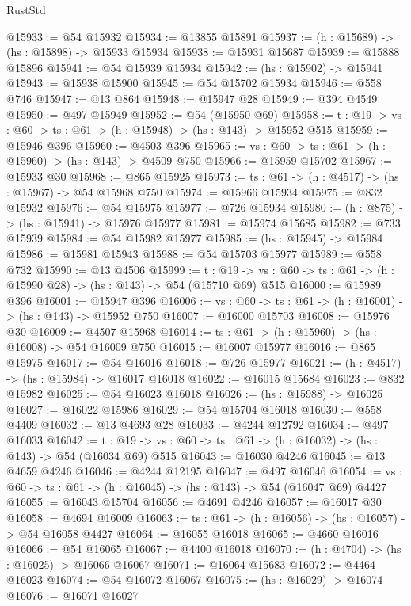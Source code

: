 \begin{lexlean}{RustStd}
\begin{coremodule}
@15933 := @54 @15932
@15934 := @13855 @15891
@15937 := (h : @15689) -> (hs : @15898) -> @15933 @15934
@15938 := @15931 @15687
@15939 := @15888 @15896
@15941 := @54 @15939 @15934
@15942 := (hs : @15902) -> @15941
@15943 := @15938 @15900
@15945 := @54 @15702 @15934
@15946 := @558 @746
@15947 := @13 @864
@15948 := @15947 @28
@15949 := @394 @4549
@15950 := @497 @15949
@15952 := @54 (@15950 @69)
@15958 := {t : @19} -> {vs : @60} -> {ts : @61} -> (h : @15948) -> (hs : @143) -> @15952 @515
@15959 := @15946 @396
@15960 := @4503 @396
@15965 := {vs : @60} -> {ts : @61} -> (h : @15960) -> (hs : @143) -> @4509 @750
@15966 := @15959 @15702
@15967 := @15933 @30
@15968 := @865 @15925
@15973 := {ts : @61} -> (h : @4517) -> (hs : @15967) -> @54 @15968 @750
@15974 := @15966 @15934
@15975 := @832 @15932
@15976 := @54 @15975
@15977 := @726 @15934
@15980 := (h : @875) -> (hs : @15941) -> @15976 @15977
@15981 := @15974 @15685
@15982 := @733 @15939
@15984 := @54 @15982 @15977
@15985 := (hs : @15945) -> @15984
@15986 := @15981 @15943
@15988 := @54 @15703 @15977
@15989 := @558 @732
@15990 := @13 @4506
@15999 := {t : @19} ->
  {vs : @60} -> {ts : @61} -> (h : @15990 @28) -> (hs : @143) -> @54 (@15710 @69) @515
@16000 := @15989 @396
@16001 := @15947 @396
@16006 := {vs : @60} -> {ts : @61} -> (h : @16001) -> (hs : @143) -> @15952 @750
@16007 := @16000 @15703
@16008 := @15976 @30
@16009 := @4507 @15968
@16014 := {ts : @61} -> (h : @15960) -> (hs : @16008) -> @54 @16009 @750
@16015 := @16007 @15977
@16016 := @865 @15975
@16017 := @54 @16016
@16018 := @726 @15977
@16021 := (h : @4517) -> (hs : @15984) -> @16017 @16018
@16022 := @16015 @15684
@16023 := @832 @15982
@16025 := @54 @16023 @16018
@16026 := (hs : @15988) -> @16025
@16027 := @16022 @15986
@16029 := @54 @15704 @16018
@16030 := @558 @4409
@16032 := @13 @4693 @28
@16033 := @4244 @12792
@16034 := @497 @16033
@16042 := {t : @19} ->
  {vs : @60} -> {ts : @61} -> (h : @16032) -> (hs : @143) -> @54 (@16034 @69) @515
@16043 := @16030 @4246
@16045 := @13 @4659 @4246
@16046 := @4244 @12195
@16047 := @497 @16046
@16054 := {vs : @60} -> {ts : @61} -> (h : @16045) -> (hs : @143) -> @54 (@16047 @69) @4427
@16055 := @16043 @15704
@16056 := @4691 @4246
@16057 := @16017 @30
@16058 := @4694 @16009
@16063 := {ts : @61} -> (h : @16056) -> (hs : @16057) -> @54 @16058 @4427
@16064 := @16055 @16018
@16065 := @4660 @16016
@16066 := @54 @16065
@16067 := @4400 @16018
@16070 := (h : @4704) -> (hs : @16025) -> @16066 @16067
@16071 := @16064 @15683
@16072 := @4464 @16023
@16074 := @54 @16072 @16067
@16075 := (hs : @16029) -> @16074
@16076 := @16071 @16027

\end{coremodule}
\end{lexlean}
